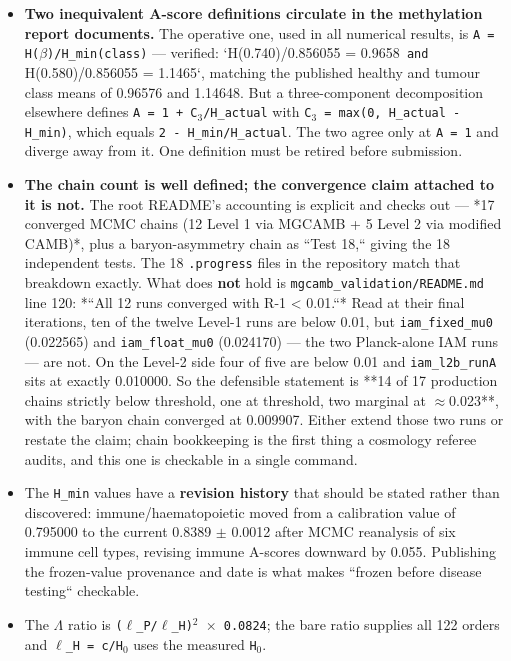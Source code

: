\documentclass[12pt,a4paper]{article}
\begin{document}
\begin{itemize}
  \item \textbf{Two inequivalent A-score definitions circulate in the methylation report documents.} The operative one, used in all numerical results, is \texttt{A = H($\beta$)/H\_min(class)} --- verified: `H(0.740)/0.856055 = 0.9658\texttt{ and }H(0.580)/0.856055 = 1.1465`, matching the published healthy and tumour class means of 0.96576 and 1.14648. But a three-component decomposition elsewhere defines \texttt{A = 1 + C$_{3}$/H\_actual} with \texttt{C$_{3}$ = max(0, H\_actual - H\_min)}, which equals \texttt{2 - H\_min/H\_actual}. The two agree only at \texttt{A = 1} and diverge away from it. One definition must be retired before submission.
  \item \textbf{The chain count is well defined; the convergence claim attached to it is not.} The root README's accounting is explicit and checks out --- *17 converged MCMC chains (12 Level 1 via MGCAMB + 5 Level 2 via modified CAMB)*, plus a baryon-asymmetry chain as ``Test 18,`` giving the 18 independent tests. The 18 \texttt{.progress} files in the repository match that breakdown exactly. What does \textbf{not} hold is \texttt{mgcamb\_validation/README.md} line 120: *``All 12 runs converged with R-1 < 0.01.``* Read at their final iterations, ten of the twelve Level-1 runs are below 0.01, but \texttt{iam\_fixed\_mu0} (0.022565) and \texttt{iam\_float\_mu0} (0.024170) --- the two Planck-alone IAM runs --- are not. On the Level-2 side four of five are below 0.01 and \texttt{iam\_l2b\_runA} sits at exactly 0.010000. So the defensible statement is **14 of 17 production chains strictly below threshold, one at threshold, two marginal at $\approx$0.023**, with the baryon chain converged at 0.009907. Either extend those two runs or restate the claim; chain bookkeeping is the first thing a cosmology referee audits, and this one is checkable in a single command.
  \item The \texttt{H\_min} values have a \textbf{revision history} that should be stated rather than discovered: immune/haematopoietic moved from a calibration value of 0.795000 to the current 0.8389 $\pm$ 0.0012 after MCMC reanalysis of six immune cell types, revising immune A-scores downward by 0.055. Publishing the frozen-value provenance and date is what makes ``frozen before disease testing`` checkable.
  \item The $\Lambda$ ratio is \texttt{($\ell$\_P/$\ell$\_H)$^{2}$ $\times$ 0.0824}; the bare ratio supplies all 122 orders and \texttt{$\ell$\_H = c/H$_{0}$} uses the measured \texttt{H$_{0}$}.
\end{itemize}
\end{document}
